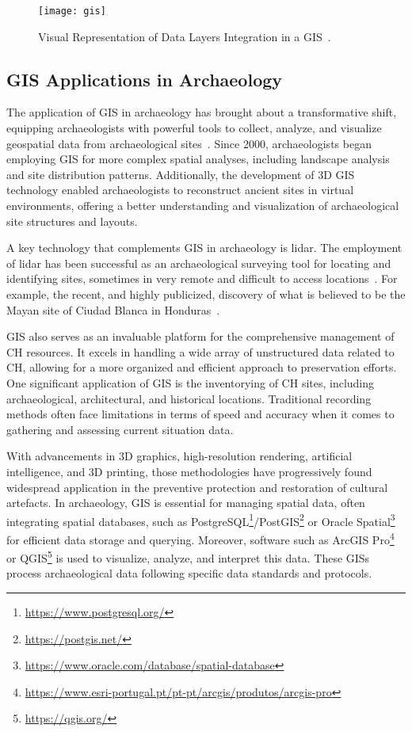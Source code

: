 \begin{figure}[h!]
    \centering
    \texttt{[image: gis]}
    \caption{Visual Representation of Data Layers Integration in a \gls{GIS}~\cite{gao_data_layers}.}
    \label{fig:gis}
\end{figure}

\subsection{GIS Applications in Archaeology}
\label{sub:gis_archeology}

The application of \gls{GIS} in archaeology has brought about a transformative shift, equipping archaeologists with powerful tools to collect, analyze, 
and visualize geospatial data from archaeological sites~\cite{yao2023overview}. Since 2000, archaeologists began employing \gls{GIS} for more complex spatial analyses, including landscape analysis and site distribution 
patterns. Additionally, the development of \gls{3D} \gls{GIS} technology enabled archaeologists to reconstruct ancient sites in virtual environments, offering a 
better understanding and visualization of archaeological site structures and layouts.

A key technology that complements \gls{GIS} in archaeology is \gls{lidar}. 
The employment of \gls{lidar} has been successful as an archaeological surveying tool for locating and identifying
sites, sometimes in very remote and difficult to access locations~\cite{article_lidar}. For example, the recent, and highly publicized, 
discovery of what is believed to be the Mayan site of Ciudad Blanca in Honduras~\cite{Tolley2012}.

\gls{GIS} also serves as an invaluable platform for the comprehensive management of \gls{CH} resources. It excels in handling a wide array of
unstructured data related to \gls{CH}, allowing for a more organized and efficient approach to preservation efforts. One significant 
application of \gls{GIS} is the inventorying of \gls{CH} sites, including archaeological, architectural, and historical locations. Traditional recording methods often face limitations in terms of speed and accuracy when
it comes to gathering and assessing current situation data.

With advancements in \gls{3D} graphics, high-resolution rendering, artificial intelligence, and \gls{3D} printing, those methodologies have progressively found widespread application in the preventive protection and restoration of cultural artefacts. 
In archaeology, \gls{GIS} is essential for managing spatial data, often integrating spatial databases, such as PostgreSQL\footnote{\url{https://www.postgresql.org/}}/PostGIS\footnote{\url{https://postgis.net/}} or Oracle Spatial\footnote{\url{https://www.oracle.com/database/spatial-database}} for efficient data storage and querying.
Moreover, software such as ArcGIS Pro\footnote{\url{https://www.esri-portugal.pt/pt-pt/arcgis/produtos/arcgis-pro}} or QGIS\footnote{\url{https://qgis.org/}} is used to visualize, analyze, and interpret this data. These \glspl{GIS} process archaeological data following specific data standards and protocols.

